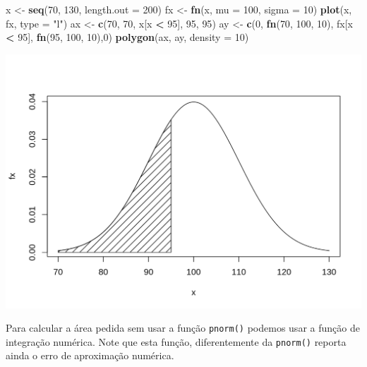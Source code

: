 \documentclass[10pt,a4paper]{book}
\newenvironment{Shaded}{\begin{snugshade}}{\end{snugshade}}
\newcommand{\KeywordTok}[1]{\textcolor[rgb]{0.13,0.29,0.53}{\textbf{#1}}}
\newcommand{\DataTypeTok}[1]{\textcolor[rgb]{0.13,0.29,0.53}{#1}}
\newcommand{\DecValTok}[1]{\textcolor[rgb]{0.00,0.00,0.81}{#1}}
\newcommand{\StringTok}[1]{\textcolor[rgb]{0.31,0.60,0.02}{#1}}
\newcommand{\OperatorTok}[1]{\textcolor[rgb]{0.81,0.36,0.00}{\textbf{#1}}}
\newcommand{\NormalTok}[1]{#1}
\begin{document}
\begin{Shaded}
\begin{Highlighting}[]
\NormalTok{x <-}\StringTok{ }\KeywordTok{seq}\NormalTok{(}\DecValTok{70}\NormalTok{, }\DecValTok{130}\NormalTok{, }\DataTypeTok{length.out =} \DecValTok{200}\NormalTok{)}
\NormalTok{fx <-}\StringTok{ }\KeywordTok{fn}\NormalTok{(x, }\DataTypeTok{mu =} \DecValTok{100}\NormalTok{, }\DataTypeTok{sigma =} \DecValTok{10}\NormalTok{)}
\KeywordTok{plot}\NormalTok{(x, fx, }\DataTypeTok{type =} \StringTok{"l"}\NormalTok{)}
\NormalTok{ax <-}\StringTok{ }\KeywordTok{c}\NormalTok{(}\DecValTok{70}\NormalTok{, }\DecValTok{70}\NormalTok{, x[x }\OperatorTok{<}\StringTok{ }\DecValTok{95}\NormalTok{], }\DecValTok{95}\NormalTok{, }\DecValTok{95}\NormalTok{)}
\NormalTok{ay <-}\StringTok{ }\KeywordTok{c}\NormalTok{(}\DecValTok{0}\NormalTok{, }\KeywordTok{fn}\NormalTok{(}\DecValTok{70}\NormalTok{, }\DecValTok{100}\NormalTok{, }\DecValTok{10}\NormalTok{), fx[x }\OperatorTok{<}\StringTok{ }\DecValTok{95}\NormalTok{], }\KeywordTok{fn}\NormalTok{(}\DecValTok{95}\NormalTok{, }\DecValTok{100}\NormalTok{, }\DecValTok{10}\NormalTok{),}\DecValTok{0}\NormalTok{)}
\KeywordTok{polygon}\NormalTok{(ax, ay, }\DataTypeTok{density =} \DecValTok{10}\NormalTok{)}
\end{Highlighting}
\end{Shaded}

\begin{center}\includegraphics{figures/unnamed-chunk-363-1} \end{center}

Para calcular a área pedida sem usar a função \texttt{pnorm()} podemos
usar a função de integração numérica. Note que esta função,
diferentemente da \texttt{pnorm()} reporta ainda o erro de aproximação
numérica.
\end{document}
